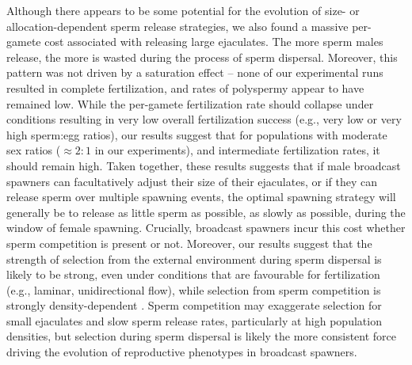 \documentclass{article}
\begin{document}
Although there appears to be some potential for the evolution of size- or allocation-dependent sperm release strategies, we also found a massive per-gamete cost associated with releasing large ejaculates. The more sperm males release, the more is wasted during the process of sperm dispersal. Moreover, this pattern was not driven by a saturation effect -- none of our experimental runs resulted in complete fertilization, and rates of polyspermy appear to have remained low. While the per-gamete fertilization rate should collapse under conditions resulting in very low overall fertilization success (e.g., very low or very high sperm:egg ratios), our results suggest that for populations with moderate sex ratios ($\approx 2:1$ in our experiments), and intermediate fertilization rates, it should remain high. Taken together, these results suggests that if male broadcast spawners can facultatively adjust their size of their ejaculates, or if they can release sperm over multiple spawning events, the optimal spawning strategy will generally be to release as little sperm as possible, as slowly as possible, during the window of female spawning. Crucially, broadcast spawners incur this cost whether sperm competition is present or not. Moreover, our results suggest that the strength of selection from the external environment during sperm dispersal is likely to be strong, even under conditions that are favourable for fertilization (e.g., laminar, unidirectional flow), while selection from sperm competition is strongly density-dependent \citep{Parker1982,Levitan1998,BodeMarshall2007}. Sperm competition may exaggerate selection for small ejaculates and slow sperm release rates, particularly at high population densities, but selection during sperm dispersal is likely the more consistent force driving the evolution of reproductive phenotypes in broadcast spawners.
\end{document}
